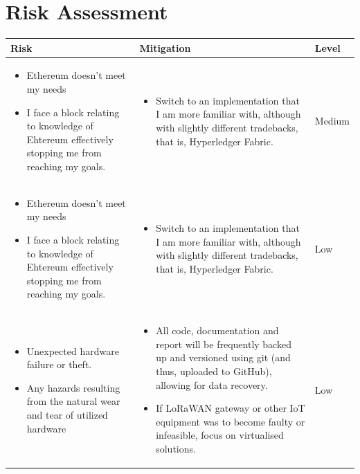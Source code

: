 \documentclass[a4paper,12pt]{article}
\begin{document}
\section*{Risk Assessment}

\bgroup
\def\arraystretch{2}
\begin{table}[H]
\centering
\begin{tabular}{|m{}|m{}|m{}|}
\hline
\textbf{Risk} & \textbf{Mitigation}                       & \textbf{Level} \\ \hline
\begin{itemize}[leftmargin=*]
  \item Ethereum doesn't meet my needs
  \item I face a block relating to knowledge of Ehtereum effectively stopping me from reaching my goals.
\end{itemize} &
\begin{itemize}[leftmargin=*]
  \item Switch to an implementation that I am more familiar with, although with slightly different tradebacks, that is, Hyperledger Fabric.
\end{itemize} &
Medium \\ \hline
\begin{itemize}[leftmargin=*]
  \item Ethereum doesn't meet my needs
  \item I face a block relating to knowledge of Ehtereum effectively stopping me from reaching my goals.
\end{itemize} &
\begin{itemize}[leftmargin=*]
  \item Switch to an implementation that I am more familiar with, although with slightly different tradebacks, that is, Hyperledger Fabric.
\end{itemize} &
Low \\ \hline
\begin{itemize}[leftmargin=*]
  \item Unexpected hardware failure or theft.
  \item Any hazards resulting from the natural wear and tear of utilized hardware
\end{itemize} &
\begin{itemize}[leftmargin=*]
  \item All code, documentation and report will be frequently backed up and versioned using git (and thus, uploaded to GitHub), allowing for data recovery.
  \item If LoRaWAN gateway or other IoT equipment was to become faulty or infeasible, focus on virtualised solutions.
\end{itemize} &
Low \\ \hline
\end{tabular}
\end{table}
\egroup
\end{document}

